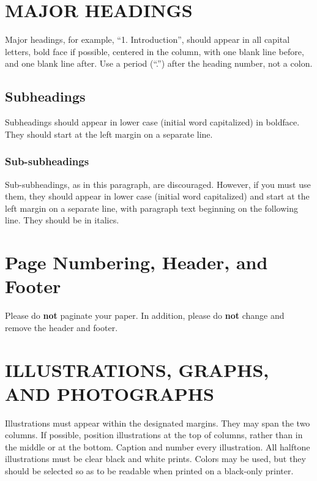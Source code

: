 \documentclass{article}
\begin{document}
\begin{sloppy}
\section{MAJOR HEADINGS}
\label{sec:majhead}

Major headings, for example, ``1. Introduction'', should appear in all capital letters, bold face if possible, centered in the column, with one blank line before, and one blank line after. Use a period (``.'') after the heading number, not a colon.

\subsection{Subheadings}
\label{ssec:subhead}

Subheadings should appear in lower case (initial word capitalized) in boldface. They should start at the left margin on a separate line. 
 
\subsubsection{Sub-subheadings}
\label{sssec:subsubhead}

Sub-subheadings, as in this paragraph, are discouraged. However, if you must use them, they should appear in lower case (initial word capitalized) and start at the left margin on a separate line, with paragraph text beginning on the following line. They should be in italics. 
 

\section{Page Numbering, Header, and Footer}
\label{sec:page}

Please do {\bf not} paginate your paper. In addition, please do {\bf not} change and remove the header and footer.

\section{ILLUSTRATIONS, GRAPHS, AND PHOTOGRAPHS}
\label{sec:illust}

Illustrations must appear within the designated margins. They may span the two columns. If possible, position illustrations at the top of columns, rather than in the middle or at the bottom. Caption and number every illustration. All halftone illustrations must be clear black and white prints. Colors may be used, but they should be selected so as to be readable when printed on a black-only printer.


\end{sloppy}
\end{document}

